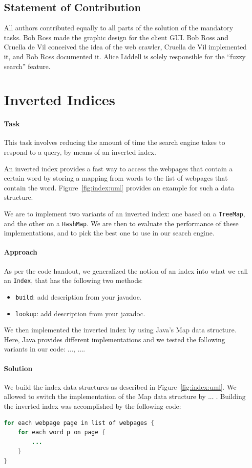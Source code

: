 \documentclass[11pt]{article}
\begin{document}
\subsection*{Statement of Contribution}
%
All authors contributed equally to all parts of the solution of the
mandatory tasks.
%
Bob Ross made the graphic design for the client GUI. 
%
Bob Ross and Cruella de Vil conceived the idea of the web crawler,
Cruella de Vil implemented it, and Bob Ross documented it.
%
Alice Liddell is solely responsible for the ``fuzzy search'' feature.

\section{Inverted Indices}
\paragraph{Task}
%
This task involves reducing the amount of time the search engine takes
to respond to a query, by means of an inverted index.
%

%
An inverted index provides a fast way to access the webpages that
contain a certain word by storing a mapping from words to the list
of webpages that contain the word.
%
Figure~\ref{fig:index:uml} provides an example for such a data structure.

%
We are to implement two variants of an inverted index: one based on a
{\tt TreeMap}, and the other on a {\tt HashMap}. We are then to
evaluate the performance of these implementations, and to pick the
best one to use in our search engine.


%
\paragraph{Approach}
%
As per the code handout, we generalized the notion of an index into what we call an
{\tt Index}, that has the following two methods:
%
\begin{itemize}
\item {\tt build}: add description from your javadoc.
\item {\tt lookup}: add description from your javadoc.

\end{itemize}
%
We then implemented the inverted index by using Java's Map data structure.
%
Here, Java provides different implementations and we tested the
following variants in our code: ..., ....

\paragraph{Solution} We build the index data structures as described in Figure~\ref{fig:index:uml}. 
We allowed to switch the implementation of the Map data structure by ... . Building the inverted index was accomplished by the following code: 
\begin{lstlisting}[language=Java]
for each webpage page in list of webpages {
    for each word p on page {
        ...
    }
}
\end{lstlisting}
\end{document}
